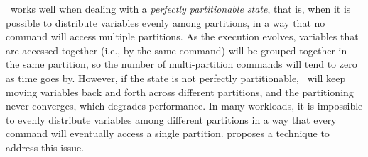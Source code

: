 \dssmr\ works well when dealing with a \emph{perfectly partitionable state}, that is, when it is possible to distribute variables evenly among partitions, in a way that no command will access multiple partitions.
As the execution evolves, variables that are accessed together (i.e., by the same command) will be grouped together in the same partition, so the number of multi-partition commands will tend to zero as time goes by.
However, if the state is not perfectly partitionable, \dssmr\ will keep moving variables back and forth across different partitions, and the partitioning never converges, which degrades performance.
%
In many workloads, it is impossible to evenly distribute variables among different partitions in a way that every command will eventually access a single partition.
\dynastar proposes a technique to address this issue.



